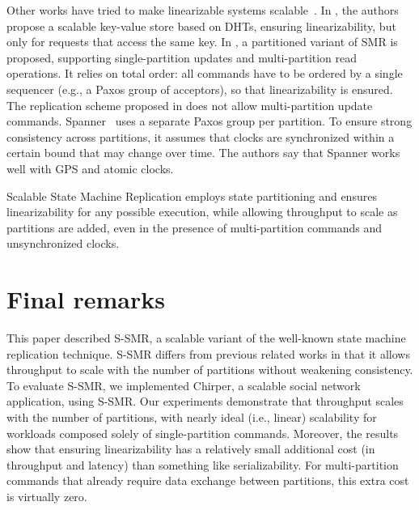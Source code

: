 \documentclass[11pt]{article}
\begin{document}
Other works have tried to make linearizable systems scalable~\cite{corbett2013spanner, Glendenning2011, Marandi11}.
In \cite{Glendenning2011}, the authors propose a scalable key-value store based on DHTs, ensuring linearizability, but only for requests that access the same key. 
In \cite{Marandi11}, a partitioned variant of SMR is proposed, supporting single-partition updates and multi-partition read operations.
It relies on total order: all commands have to be ordered by a single sequencer (e.g., a Paxos group of acceptors), so that linearizability is ensured.
The replication scheme proposed in \cite{Marandi11} does not allow multi-partition update commands.
Spanner~\cite{corbett2013spanner} uses a separate Paxos group per partition.
To ensure strong consistency across partitions, it assumes that clocks are synchronized within a certain bound that may change over time.
The authors say that Spanner works well with GPS and atomic clocks.

Scalable State Machine Replication employs state partitioning and ensures linearizability for any possible execution, while allowing throughput to scale as partitions are added, even in the presence of multi-partition commands and unsynchronized clocks.

\section{Final remarks}

This paper described S-SMR, a scalable variant of the well-known state machine replication technique. 
S-SMR differs from previous related works in that it allows throughput to scale with the number of partitions without weakening consistency. 
To evaluate S-SMR, we implemented Chirper, a scalable social network application, using S-SMR.
Our experiments demonstrate that throughput scales with the number of partitions, with nearly ideal (i.e., linear) scalability for workloads composed solely of single-partition commands.
Moreover, the results show that ensuring linearizability has a relatively small additional cost (in throughput and latency) than something like serializability.
For multi-partition commands that already require data exchange between partitions, this extra cost is virtually zero.



\end{document}
